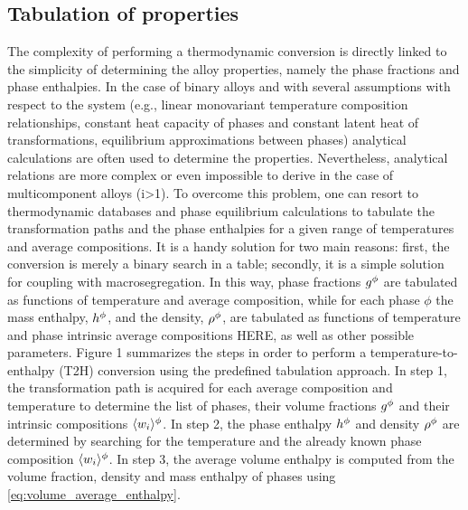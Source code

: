 \subsection{Tabulation of properties}
The complexity of performing a thermodynamic conversion is directly linked to the simplicity of determining the alloy properties, namely the 
phase fractions and phase enthalpies. In the case of binary alloys and with several assumptions with respect to the system (e.g., linear monovariant 
temperature composition relationships, constant heat capacity of phases and constant latent heat of transformations, equilibrium approximations between 
phases) analytical calculations are often used to determine the properties. Nevertheless, analytical relations are more complex or even impossible to 
derive in the case of multicomponent alloys (i>1). To overcome this problem, one can resort to thermodynamic databases and phase equilibrium calculations 
to tabulate the transformation paths and the phase enthalpies for a given range of temperatures and average compositions. It is a handy solution for two 
main reasons: first, the conversion is merely a binary search in a table; secondly, it is a simple solution for coupling with macrosegregation. In this way, 
phase fractions $g^{\phi} $ are tabulated as functions of temperature and average composition, while for each phase $\phi$ the mass enthalpy, $h^{\phi} $, and 
the density, $\rho^{\phi} $, are tabulated as functions of temperature and phase intrinsic average compositions HERE, as well as other possible parameters. 
Figure 1 summarizes the steps in order to perform a temperature-to-enthalpy (T2H) conversion using the predefined tabulation approach. In step 1, the 
transformation path is acquired for each average composition and temperature to determine the list of phases, their volume fractions $g^{\phi} $ and their intrinsic 
compositions $\langle w_i \rangle^{\phi}$. In step 2, the phase enthalpy $h^{\phi} $  and density $\rho^{\phi} $ are determined by searching for the temperature 
and the already known phase composition $\langle w_i \rangle^{\phi}$. In step 3, the average volume enthalpy is computed from the volume fraction, density and mass enthalpy 
of phases using \autoref{eq:volume_average_enthalpy}.


